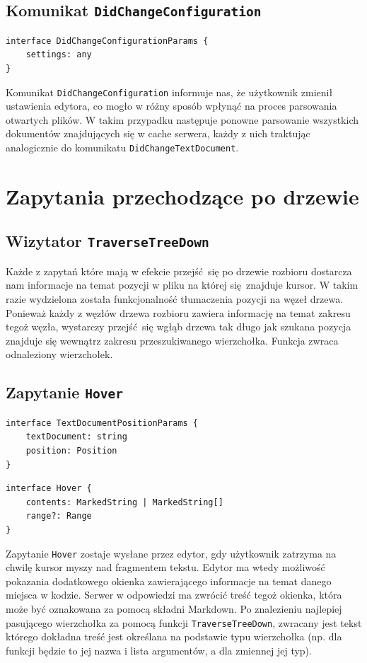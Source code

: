 \subsection{Komunikat \texttt{DidChangeConfiguration}}
\begin{lstlisting}[title=Struktura argumentu komunikatu]
interface DidChangeConfigurationParams {
    settings: any
}
\end{lstlisting}
Komunikat \texttt{DidChangeConfiguration} informuje nas, że użytkownik zmienił ustawienia edytora, co mogło w różny sposób wpłynąć na proces parsowania otwartych plików. W takim przypadku następuje ponowne parsowanie wszystkich dokumentów znajdujących się w cache serwera, każdy z nich traktując analogicznie do komunikatu \texttt{DidChangeTextDocument}.

\section{Zapytania przechodzące po drzewie}
\subsection{Wizytator \texttt{TraverseTreeDown}}
Każde z zapytań które mają w efekcie przejść się po drzewie rozbioru dostarcza nam informacje na temat pozycji w pliku na której się znajduje kursor. W takim razie wydzielona została funkcjonalność tłumaczenia pozycji na węzeł drzewa. Ponieważ każdy z węzłów drzewa rozbioru zawiera informację na temat zakresu tegoż węzła, wystarczy przejść się wgłąb drzewa tak długo jak szukana pozycja znajduje się wewnątrz zakresu przeszukiwanego wierzchołka. Funkcja zwraca odnaleziony wierzchołek.

\subsection{Zapytanie \texttt{Hover}}
\begin{lstlisting}[title=Struktura argumentu zapytania]
interface TextDocumentPositionParams {
    textDocument: string
    position: Position
}
\end{lstlisting}

\begin{lstlisting}[title=Struktura odpowiedzi]
interface Hover {
    contents: MarkedString | MarkedString[]
    range?: Range
}
\end{lstlisting}
Zapytanie \texttt{Hover} zostaje wysłane przez edytor, gdy użytkownik zatrzyma na chwilę kursor myszy nad fragmentem tekstu. Edytor ma wtedy możliwość pokazania dodatkowego okienka zawierającego informacje na temat danego miejsca w kodzie. Serwer w odpowiedzi ma zwrócić treść tegoż okienka, która może być oznakowana za pomocą składni Markdown. Po znalezieniu najlepiej pasującego wierzchołka za pomocą funkcji \texttt{TraverseTreeDown}, zwracany jest tekst którego dokładna treść jest określana na podstawie typu wierzchołka (np. dla funkcji będzie to jej nazwa i lista argumentów, a dla zmiennej jej typ).

